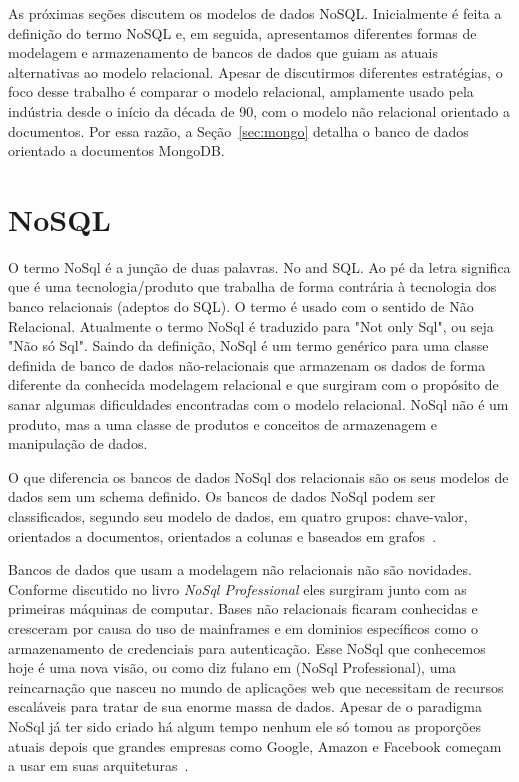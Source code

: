 
As próximas seções discutem os modelos de dados NoSQL. Inicialmente é
feita a definição do termo NoSQL e, em seguida,
apresentamos diferentes formas de modelagem e armazenamento de bancos de
dados que guiam as atuais alternativas ao modelo relacional. Apesar de
discutirmos diferentes estratégias, o foco desse trabalho é comparar o
modelo relacional, amplamente usado pela indústria desde o início da
década de 90, com o modelo não relacional orientado a documentos. Por
essa razão, a Seção~\ref{sec:mongo} detalha o banco de dados orientado
a documentos MongoDB. 


\section{NoSQL}

O termo NoSql é a junção de duas palavras. No and SQL. Ao pé da letra significa que é uma tecnologia/produto que trabalha de forma contrária à tecnologia dos banco relacionais (adeptos do SQL). O termo é usado com o sentido de Não Relacional. Atualmente o termo NoSql é traduzido para "Not only Sql", ou seja "Não só Sql".
Saindo da definição, NoSql é um termo genérico para uma classe definida de banco de dados não-relacionais que armazenam os dados  de forma diferente da conhecida modelagem relacional e que surgiram com o propósito de sanar algumas dificuldades encontradas com o modelo relacional. NoSql não é um produto, mas a uma classe de produtos e conceitos de armazenagem e manipulação de dados. 

O que diferencia os bancos de dados NoSql dos relacionais são os seus modelos de dados sem um schema definido. Os bancos de dados NoSql podem ser classificados, segundo seu modelo de dados, em quatro grupos: chave-valor, orientados a documentos, orientados a colunas e baseados em grafos~\cite{nosqlxrelacional,nosqlevaluation}.

Bancos de dados que usam a modelagem não relacionais não são novidades. Conforme discutido no livro \emph{NoSql Professional}\cite{} eles surgiram junto com as primeiras máquinas de computar. Bases não relacionais ficaram conhecidas e cresceram por causa do uso de mainframes e em dominios específicos como o armazenamento de credenciais para autenticação. Esse NoSql que conhecemos hoje é uma nova visão, ou como diz {\color{red}fulano} em (NoSql Professional), uma reincarnação que nasceu no mundo de aplicações web que necessitam de recursos escaláveis para tratar de sua enorme massa de dados. Apesar de o paradigma NoSql já ter sido criado há algum tempo nenhum ele só tomou as proporções atuais depois que grandes empresas como Google, Amazon e Facebook começam a usar em suas arquiteturas~\cite{nosqlevaluation}.

